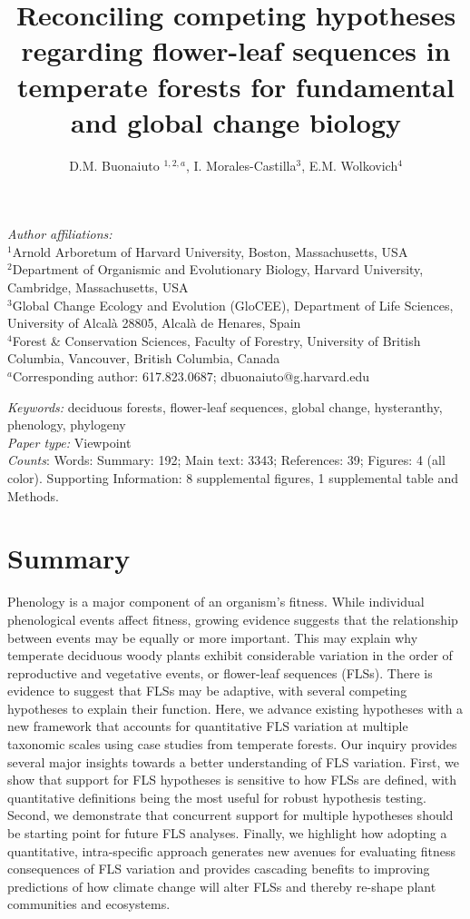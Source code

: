 \documentclass[11pt]{article}
\title{Reconciling competing hypotheses regarding flower-leaf sequences in temperate forests for fundamental and global change biology}
\date{}
\author{D.M. Buonaiuto $^{1,2,a}$, I. Morales-Castilla$^{3}$, E.M. Wolkovich$^{4}$}
\begin{document}
\maketitle
\linenumbers
\noindent \emph{Author affiliations:}\\
\noindent $^1$Arnold Arboretum of Harvard University, Boston, Massachusetts, USA\\
$^2$Department of Organismic and Evolutionary Biology, Harvard University, Cambridge, Massachusetts, USA\\
$^3$Global Change Ecology and Evolution (GloCEE), Department of Life Sciences, University of Alcal\`a  28805, Alcal\`a de Henares, Spain\\
$^4$Forest \& Conservation Sciences, Faculty of Forestry, University of British Columbia, Vancouver, British Columbia, Canada\\
$^a$Corresponding author: 617.823.0687; dbuonaiuto@g.harvard.edu

\noindent \emph{Keywords:} deciduous forests, flower-leaf sequences, global change, hysteranthy, phenology, phylogeny \\ %
\emph{Paper type:} Viewpoint\\
 \emph{Counts}: Words: Summary: 192; Main text: 3343; References: 39;  Figures: 4 (all color). Supporting Information: 8 supplemental figures, 1 supplemental table and Methods.
\newpage

\section*{Summary}
Phenology is a major component of an organism's fitness. While individual phenological events affect fitness, growing evidence suggests that the relationship between events may be equally or more important. This may explain why temperate deciduous woody plants exhibit considerable variation in the order of reproductive and vegetative events, or flower-leaf sequences (FLSs). There is evidence to suggest that FLSs may be adaptive, with several competing hypotheses to explain their function. Here, we advance existing hypotheses with a new framework that accounts for quantitative FLS variation at multiple taxonomic scales using case studies from temperate forests. Our inquiry provides several major insights towards a better understanding of FLS variation. First, we show that support for FLS hypotheses is sensitive to how FLSs are defined, with quantitative definitions being the most useful for robust hypothesis testing. Second, we demonstrate that concurrent support for multiple hypotheses should be starting point for future FLS analyses. Finally, we highlight how adopting a quantitative, intra-specific approach generates new avenues for evaluating fitness consequences of FLS variation and provides cascading benefits to improving predictions of how climate change will alter FLSs and thereby re-shape plant communities and ecosystems.
\end{document}
